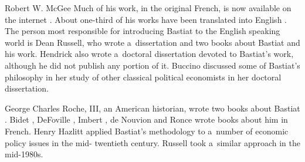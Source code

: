 \begin{artengenv}{Robert W. McGee}
Much of his work, in the original French, is now available on the internet 
\parencites[][]{bastiat_ce_1850}[][]{bastiat_essais_1861}[][]{bastiat_libre-echange_1862}[][]{bastiat_correspondance_1862}[][]{bastiat_cobden_1864}[][]{bastiat_harmonies_1870}[][]{bastiat_ce_1873}[][]{bastiat_sophismes_1873}. %
 About one-third of his works have been translated into English 
\parencites[][]{bastiat_bastiat_1926}[][]{bastiat_selected_1964}[][]{bastiat_economic_1964}[][]{bastiat_economic_1964-1}[][]{bastiat_providence_1991}[][]{bastiat_law_1998}[][]{bastiat_bastiat_2007}. %
 The person most responsible for introducing Bastiat to the English speaking world is Dean Russell, who wrote a~dissertation 
\parencite[][]{russell_frederic_1959} %
 and two books 
\parencites[][]{russell_frederic_1969}[][]{russell_government_1985} %
 about Bastiat and his work. Hendrick 
\parencite*[][]{hendrick_frederic_1987} %
 also wrote a~doctoral dissertation devoted to Bastiat's work, although he did not publish any portion of it. Buccino 
\parencite*[][]{buccino_examination_1990} %
 discussed some of Bastiat's philosophy in her study of other classical political economists in her doctoral dissertation.



George Charles Roche, III, an American historian, wrote two books about Bastiat 
\parencites[][]{roche_frederic_1971}[][]{roche_free_1993}. %
 Bidet 
\parencite*[][]{bidet_frederic_1906}, %
 DeFoville 
\parencite*[][]{defoville1889oeuvres}, %
 Imbert 
\parencite*[][]{imbert_frederic_1913}, %
 de Nouvion 
\parencite*[][]{nouvion_frederic_1905} %
 and Ronce 
\parencite*[][]{ronce_frederic_1905} %
 wrote books about him in French. Henry Hazlitt 
\parencites*[][]{hazlitt_economics_1946}[][]{hazlitt_economics_1979} %
 applied Bastiat's methodology to a~number of economic policy issues in the mid- twentieth century. Russell 
\parencite*[][]{russell_government_1985} %
 took a~similar approach in the mid-1980s.




\end{artengenv}
